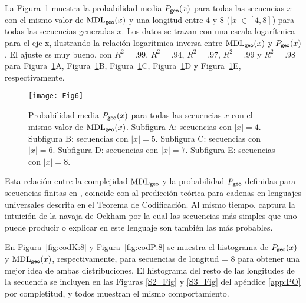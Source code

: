 La Figura~\ref{fig:codR} muestra la probabilidad media $P_{{\sf geo}}(x)$ para todas las secuencias $x$ con el mismo valor de ${\rm MDL}_{{\sf geo}}(x)$ y una longitud entre 4 y 8 ($|x| \in \left[4,8 \right]$) para todas las secuencias generadas $x$. Los datos se trazan con una escala logarítmica para el eje x, ilustrando la relación logarítmica inversa entre ${\rm MDL}_{{\sf geo}}(x)$ y $P_{{\sf geo}}(x)$. El ajuste es muy bueno, con $R^2=.99$, $R^2=.94$, $R^2=.97$, $R^2=.99$ y $R^2=.98$ para Figura~\ref{fig:codR}A, Figura~\ref{fig:codR}B, Figura~\ref{fig:codR}C, Figura~\ref{fig:codR}D y Figura~\ref{fig:codR}E, respectivamente.

\begin{figure}[!ht]
    \centering
    \texttt{[image: Fig6]}
    \caption{Probabilidad media $P_{{\sf geo}}(x)$ para todas las secuencias $x$ con el mismo valor de ${\rm MDL}_{{\sf geo}}(x)$.
    Subfigura A: secuencias con $|x| = 4$.
    Subfigura B: secuencias con $|x| = 5$.
    Subfigura C: secuencias con $|x| = 6$.
    Subfigura D: secuencias con $|x| = 7$.
    Subfigura E: secuencias con $|x| = 8$.}
    \label{fig:codR}
\end{figure}


Esta relación entre la complejidad ${\rm MDL}_{{\sf geo}}$ y la probabilidad $P_{{\sf geo}}$ definidas para secuencias finitas en \gramgeo, coincide con al predicción teórica para cadenas en lenguajes universales descrita en el Teorema de Codificación. Al mismo tiempo, captura la intuición de la navaja de Ockham por la cual las secuencias más simples que uno puede producir o explicar en este lenguaje son también las más probables.


En Figura~\ref{fig:codK:8} y Figura~\ref{fig:codP:8} se muestra el histograma de $P_{{\sf geo}}(x)$ y ${\rm MDL}_{{\sf geo}}(x)$, respectivamente, para secuencias de longitud = 8 para obtener una mejor idea de ambas distribuciones. El histograma del resto de las longitudes de la secuencia se incluyen en las Figuras \ref{S2_Fig} y \ref{S3_Fig} del apéndice \ref{app:PO} por completitud, y todos muestran el mismo comportamiento.

